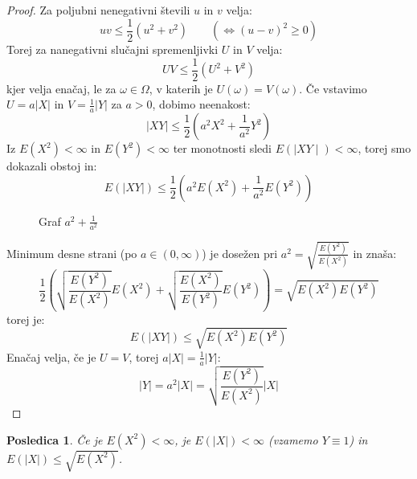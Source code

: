 \documentclass[12pt]{book}
\def\n{\noindent}
\theoremstyle{definition}
\theoremstyle{plain}
\theoremstyle{plain}
\theoremstyle{plain}
\newtheorem{posledica}{Posledica}
\theoremstyle{remark}
\begin{document}
\begin{proof}
    Za poljubni nenegativni števili $u$ in $v$ velja: 
    $$
    u v \leq \frac{1}{2}\left(u^2+v^2\right) \qquad \left(\iff (u-v)^2 \geq 0 \right)
    $$
    Torej za nanegativni slučajni spremenljivki $U$ in $V$ velja:
    $$
    U V \leq \frac{1}{2}\left(U^2+V^2\right)
    $$
    kjer velja enačaj, le za $\omega \in \Omega$, v katerih je $U(\omega) = V(\omega)$. Če vstavimo $U=a|X|$ in $V=\frac{1}{a} |Y|$ za $a>0$, dobimo neenakost: 
    $$
    |X Y| \leq \frac{1}{2}\left(a^2 X^2+\frac{1}{a^2} Y^2\right)
    $$
    Iz $E\left(X^2\right)<\infty$ in $E\left(Y^2\right)<\infty$ ter monotnosti sledi $E(\mid X Y \mid)<\infty$, torej smo dokazali obstoj in:
    $$
    E(|XY|) \leq \frac{1}{2}\left(a^2 E\left(X^2\right)+\frac{1}{a^2} E\left(Y^2\right)\right)
    $$  

    \begin{figure}[H]
        \centering

        \caption{Graf $a^2 + \frac{1}{a^2}$}
        \label{fig:8}
    \end{figure}

    \n Minimum desne strani (po $a \in (0, \infty)$) je dosežen pri $a^2=\sqrt{\frac{E\left(Y^2\right)}{E\left(X^2\right)}}$ in znaša: 
    $$
    \frac{1}{2}\left(\sqrt{\frac{E\left(Y^2\right)}{E\left(X^2\right)}}  E\left(X^2\right)+\sqrt{\frac{E\left(X^2\right)}{E\left(Y^2\right)}}  E\left(Y^2\right)\right) = \sqrt{E\left(X^2\right) E\left(Y^2\right)}
    $$
    torej je: 
    $$
    E(|X Y|) \leq \sqrt{E\left(X^2\right) E\left(Y^2\right)}
    $$
    Enačaj velja, če je $U = V$, torej  $a |X|= \frac{1}{a}|Y|$:
    $$
    |Y|=a^2 |X|=\sqrt{\frac{E\left(Y^2\right)}{E\left(X^2\right)}} |X|
    $$
\end{proof}

\begin{posledica}
    Če je $E\left(X^2\right)<\infty$, je $E(|X|)<\infty$ (vzamemo $Y \equiv 1$) in $E(|X|) \leq \sqrt{E\left(X^2\right)}$. 
\end{posledica}
\end{document}
